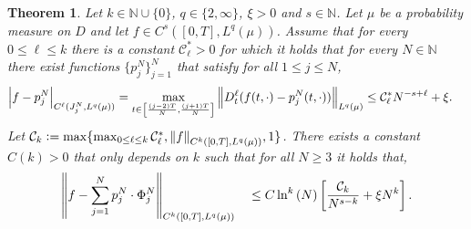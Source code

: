 \documentclass{article}
\numberwithin{equation}{section}
\newcommand{\N}{\mathbb{N}}
\newcommand{\cC}{\mathcal{C}}
\newcommand{\1}{\mathbbm{1}}
\newcommand{\hkunit}[1]{\norm{#1}_{C^k([0,T], L^q(\mu))}}
\newtheorem{theorem}{Theorem}[section]
\begin{document}
\begin{theorem}\label{thm:tanh-approximation}
Let $k\in\N\cup\{0\}$, $q\in\{2,\infty\}$, $\xi>0$ and $s\in \N$. Let $\mu$ be a probability measure on $D$ and let $f\in C^s([0,T], L^q(\mu))$. 
Assume that for every $0\leq \ell \leq k$ there is a constant $\cC^*_\ell>0$ for which it holds that for every $N\in\N$ there exist functions $\{p_j^N\}_{j=1}^N$ that satisfy for all $ 1\leq j\leq N$,
\begin{align}\label{eq:pkn-acc-sobolev}
\begin{split}
    \abs{f-p_j^N}_{C^\ell(J^N_j, L^q(\mu))}=\max_{t\in \left[\frac{(j-2)T}{N},\frac{(j+1)T}{N}\right]}\norm{D_t^\ell(f(t,\cdot)-p_j^N(t,\cdot))}_{L^q(\mu)} &\leq   \mathcal{C^*_{\ell}}N^{-s+\ell}+\xi.
\end{split}
\end{align}
Let $\mathcal{C}_k:=\max\{\max_{0\leq \ell \leq k}\mathcal{C}^*_\ell, \hkunit{f},1\}$. There exists a constant $C(k)>0$ that only depends on $k$ such that for all $N\geq 3$ it holds that,
\begin{equation}
\begin{split}
    \hkunit{f-\sum_{j=1}^N p_j^N\cdot \Phi^{N}_j} \quad \leq C \ln^k\left(N\right)\left[\frac{\mathcal{C}_k}{N^{s-k}} + \xi N^k\right]. 
\end{split}
\end{equation}
\end{theorem}
\end{document}
